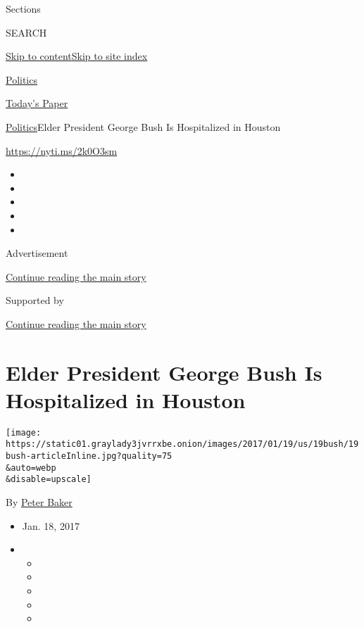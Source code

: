 Sections

SEARCH

\protect\hyperlink{site-content}{Skip to
content}\protect\hyperlink{site-index}{Skip to site index}

\href{https://www.nytimes3xbfgragh.onion/section/politics}{Politics}

\href{https://myaccount.nytimes3xbfgragh.onion/auth/login?response_type=cookie\&client_id=vi}{}

\href{https://www.nytimes3xbfgragh.onion/section/todayspaper}{Today's
Paper}

\href{/section/politics}{Politics}\textbar{}Elder President George Bush
Is Hospitalized in Houston

\url{https://nyti.ms/2k0O3sm}

\begin{itemize}
\item
\item
\item
\item
\item
\end{itemize}

Advertisement

\protect\hyperlink{after-top}{Continue reading the main story}

Supported by

\protect\hyperlink{after-sponsor}{Continue reading the main story}

\hypertarget{elder-president-george-bush-is-hospitalized-in-houston}{%
\section{Elder President George Bush Is Hospitalized in
Houston}\label{elder-president-george-bush-is-hospitalized-in-houston}}

\texttt{[image: https://static01.graylady3jvrrxbe.onion/images/2017/01/19/us/19bush/19bush-articleInline.jpg?quality=75\\\&auto=webp\\\&disable=upscale]}

By \href{http://www.nytimes3xbfgragh.onion/by/peter-baker}{Peter Baker}

\begin{itemize}
\item
  Jan. 18, 2017
\item
  \begin{itemize}
  \item
  \item
  \item
  \item
  \item
  \end{itemize}
\end{itemize}

